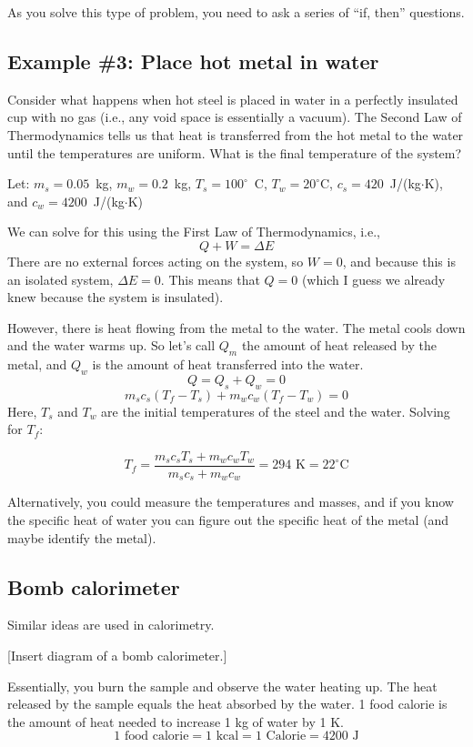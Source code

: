 As you solve this type of problem, you need to ask a series of ``if, then'' questions.


\subsection{Example \#3: Place hot metal in water}
Consider what happens when hot steel is placed in water in a perfectly insulated cup with no gas (i.e., any void space is essentially a vacuum). The Second Law of Thermodynamics tells us that heat is transferred from the hot metal to the water until the temperatures are uniform. What is the final temperature of the system?

Let: $m_{s}=0.05$~kg, $m_w=0.2$~kg, $T_s=100^\circ$~C, $T_w=20^\circ$C, $c_s=420$~J/(kg$\cdot$K), and $c_w=4200$~J/(kg$\cdot$K)

We can solve for this using the First Law of Thermodynamics, i.e.,
$$Q+W=\Delta{E}$$
There are no external forces acting on the system, so $W=0$, and because this is an isolated system, $\Delta{E}=0$. This means that $Q=0$ (which I guess we already knew because the system is insulated).

However, there is heat flowing from the metal to the water. The metal cools down and the water warms up. So let's call $Q_m$ the amount of heat released by the metal, and $Q_w$ is the amount of heat transferred into the water.
$$Q=Q_s+Q_w=0$$
$$m_sc_s(T_f-T_s)+m_wc_w(T_f-T_w)=0$$
Here, $T_s$ and $T_w$ are the initial temperatures of the steel and the water. Solving for $T_f$:

$$T_f=\frac{m_sc_sT_s+m_wc_wT_w}{m_sc_s+m_wc_w}=294\mbox{ K}=22^\circ\mbox{C}$$

Alternatively, you could measure the temperatures and masses, and if you know the specific heat of water you can figure out the specific heat of the metal (and maybe identify the metal).

\subsection{Bomb calorimeter}
Similar ideas are used in calorimetry.

[Insert diagram of a bomb calorimeter.]
\vspace{5cm}

Essentially, you burn the sample and observe the water heating up. The heat released by the sample equals the heat absorbed by the water. 1 food calorie is the amount of heat needed to increase 1 kg of water by 1 K.
$$1\mbox{ food calorie} = 1\mbox{ kcal} = 1\mbox{ Calorie}= 4200\mbox{ J}$$

